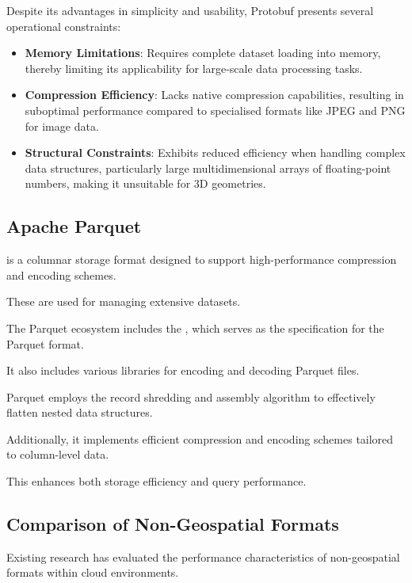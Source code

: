Despite its advantages in simplicity and usability, Protobuf presents several operational constraints:
\begin{itemize}
  \item \textbf{Memory Limitations}: Requires complete dataset loading into memory, thereby limiting its applicability for large-scale data processing tasks.
  \item \textbf{Compression Efficiency}: Lacks native compression capabilities, resulting in suboptimal performance compared to specialised formats like JPEG and PNG for image data.
  \item \textbf{Structural Constraints}: Exhibits reduced efficiency when handling complex data structures, particularly large multidimensional arrays of floating-point numbers, making it unsuitable for 3D geometries.
\end{itemize}

\subsection{Apache Parquet}
\label{rw:non_geospatial_formats:parquet}
\citet{parquet} is a columnar storage format designed to support high-performance compression and encoding schemes.

These are used for managing extensive datasets.

The Parquet ecosystem includes the \citet{parquet-format}, which serves as the specification for the Parquet format.

It also includes various libraries for encoding and decoding Parquet files.

Parquet employs the record shredding and assembly algorithm \citep{dremel_2010} to effectively flatten nested data structures.

Additionally, it implements efficient compression and encoding schemes tailored to column-level data.

This enhances both storage efficiency and query performance.

\subsection{Comparison of Non-Geospatial Formats}
\label{rw:non_geospatial_formats:comparison}

Existing research has evaluated the performance characteristics of non-geospatial formats within cloud environments.

